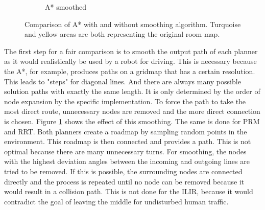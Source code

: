 \begin{figure}[h]
\begin{subfigure}{.24\textwidth}
      \caption{A* smoothed}
    \end{subfigure}
    \caption[Comparison of A* with and without smoothing algorithm]{Comparison of A* with and without smoothing algorithm. Turquoise and yellow areas are both representing the original room map.}
    \label{fig:smoothing}
\end{figure}

The first step for a fair comparison is to smooth the output path of each planner as it would realistically be used by a robot for driving. This is necessary because the A*, for example, produces paths on a gridmap that has a certain resolution. This leads to "steps" for diagonal lines. And there are always many possible solution paths with exactly the same length. It is only determined by the order of node expansion by the specific implementation. To force the path to take the most direct route, unnecessary nodes are removed and the more direct connection is chosen. Figure \ref{fig:smoothing} shows the effect of this smoothing. The same is done for PRM and RRT. Both planners create a roadmap by sampling random points in the environment. This roadmap is then connected and provides a path. This is not optimal because there are many unnecessary turns. For smoothing, the nodes with the highest deviation angles between the incoming and outgoing lines are tried to be removed. If this is possible, the surrounding nodes are connected directly and the process is repeated until no node can be removed because it would result in a collision path. This is not done for the ILIR, because it would contradict the goal of leaving the middle for undisturbed human traffic.

